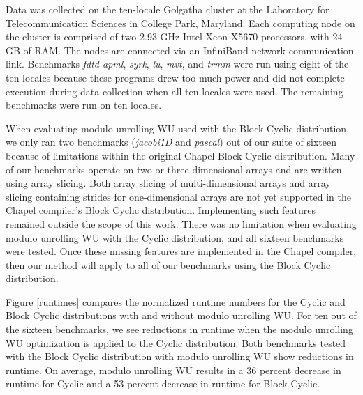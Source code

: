 Data was collected on the ten-locale Golgatha cluster at the Laboratory for Telecommunication Sciences in College Park, Maryland. Each computing node on the cluster is comprised of two 2.93 GHz Intel Xeon X5670 processors, with 24 GB of RAM. The nodes are connected via an InfiniBand network communication link. Benchmarks \textit{fdtd-apml}, \textit{syrk}, \textit{lu}, \textit{mvt}, and \textit{trmm} were run using eight of the ten locales because these programs drew too much power and did not complete execution during data collection when all ten locales were used. The remaining benchmarks were run on ten locales. 

When evaluating modulo unrolling WU used with the Block Cyclic distribution, we only ran two benchmarks (\textit{jacobi1D} and \textit{pascal}) out of our suite of sixteen because of limitations within the original Chapel Block Cyclic distribution. Many of our benchmarks operate on two or three-dimensional arrays and are written using array slicing. Both array slicing of multi-dimensional arrays and array slicing containing strides for one-dimensional arrays are not yet supported in the Chapel compiler's Block Cyclic distribution. Implementing such features remained outside the scope of this work. There was no limitation when evaluating modulo unrolling WU with the Cyclic distribution, and all sixteen benchmarks were tested. Once these missing features are implemented in the Chapel compiler, then our method will apply to all of our benchmarks using the Block Cyclic distribution.

Figure \ref{runtimes} compares the normalized runtime numbers for the Cyclic and Block Cyclic distributions with and without modulo unrolling WU. For ten out of the sixteen benchmarks, we see reductions in runtime when the modulo unrolling WU optimization is applied to the Cyclic distribution. Both benchmarks tested with the Block Cyclic distribution with modulo unrolling WU show reductions in runtime. On average, modulo unrolling WU results in a 36 percent decrease in runtime for Cyclic and a 53 percent decrease in runtime for Block Cyclic. 

